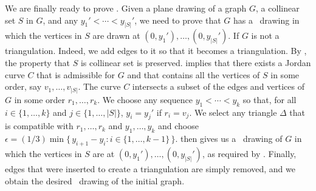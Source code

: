 We are finally ready to prove . Given a plane drawing
of a graph $G$, a collinear set $S$ in $G$,
	and any $y_1'<\cdots<y_{|S|}'$, we need to prove that $G$ has
	a \Fary\ drawing in which the vertices in $S$ are drawn at
	$(0,y_1'),\ldots,(0,y_{|S|}')$. If $G$ is not a
        triangulation. Indeed, we add edges to it
so that it becomes a triangulation.
By ,
the property that $S$ is collinear set is  preserved.
  implies
	that there exists a Jordan curve $C$ that is admissible for $G$
	and that contains all the vertices of $S$ in some order, say
	$v_1,\ldots,v_{|S|}$.  The curve $C$ intersects a subset of the edges
	and vertices of $G$ in some order $r_1,\ldots,r_k$.  We choose any
	sequence $y_1<\cdots<y_k$ so that, for all $i\in\{1,\ldots,k\}$ and
	$j\in\{1,\ldots,|S|\}$, $y_i = y_j'$ if $r_i=v_j$.  We select
	any triangle $\Delta$ that is compatible with $r_1,\ldots,r_k$ and
	$y_1,\ldots,y_k$ and choose $\epsilon = (1/3)\min\{\,y_{i+1}-y_{i}:
	i\in\{1,\ldots,k-1\}\,\}$.   then gives us a \Fary\
	drawing of $G$ in which the vertices in $S$ are at
        $(0,y_1'),\ldots,(0,y_{|S|}')$, as required by
        .
Finally, edges that were inserted to create a triangulation are simply removed, and we obtain the desired \Fary\ drawing of the initial graph.



